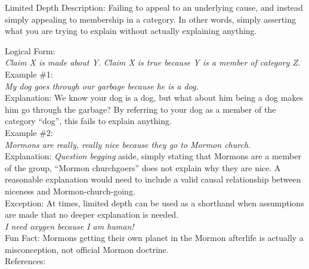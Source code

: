\documentclass[a4paper,12pt,single,pdftex]{scrbook}
\begin{document}
  

Limited Depth
    Description: Failing to appeal to an underlying cause, and instead simply appealing to membership in a category.  In other words, simply asserting what you are trying to explain without actually explaining anything.

    
      Logical Form:
    \\

    
      {\em Claim X is made about Y.} \newline
{\em Claim X is true because Y is a member of category Z.}
    \\

    
      Example \#1:
    \\

    
      {\em My dog goes through our garbage because he is a dog.}
    \\

    
      Explanation: We know your dog is a dog, but what about him being a dog makes him go through the garbage?  By referring to your dog as a member of the category “dog”, this fails to explain anything.
    \\

    
      Example \#2:
    \\

    
      {\em Mormons are really, really nice because they go to Mormon church.}
    \\

    
      Explanation: {\it Question begging} aside, simply stating that Mormons are a member of the group, “Mormon churchgoers” does not explain why they are nice.  A reasonable explanation would need to include a valid causal relationship between niceness and Mormon-church-going.
    \\

    
      Exception: At times, limited depth can be used as a shorthand when assumptions are made that no deeper explanation is needed. 
    \\

    
      {\em I need oxygen because I am human!}
    \\

    
      Fun Fact: Mormons getting their own planet in the Mormon afterlife is actually a misconception, not official Mormon doctrine.
    \\

    References:

    
      
        
      \\
\end{document}
